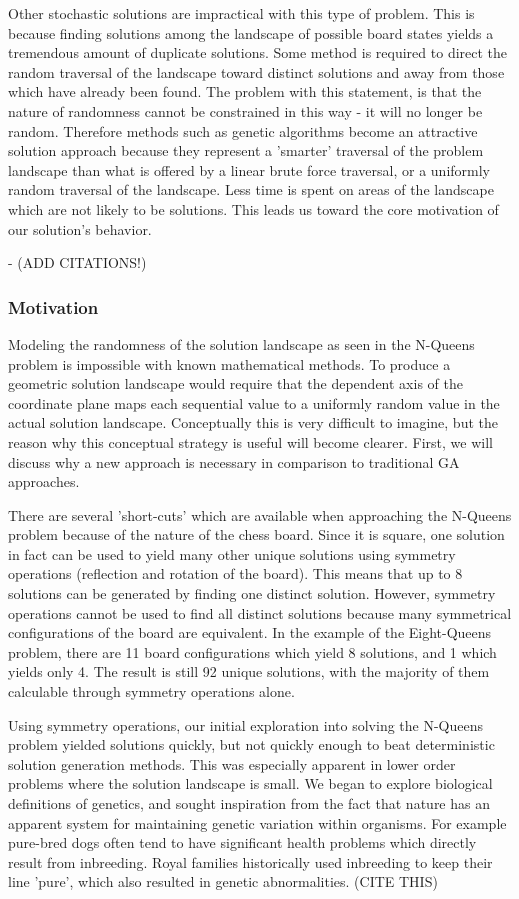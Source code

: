 \documentclass{sig-alternate}
\begin{document}
Other stochastic solutions are impractical with this type of problem. This is because finding solutions among the landscape of possible board states yields a tremendous amount of duplicate solutions. Some method is required to direct the random traversal of the landscape toward distinct solutions and away from those which have already been found. The problem with this statement, is that the nature of randomness cannot be constrained in this way - it will no longer be random. Therefore methods such as genetic algorithms become an attractive solution approach  because they represent a 'smarter' traversal of the problem landscape than what is offered by a linear brute force traversal, or a uniformly random traversal of the landscape. Less time is spent on areas of the landscape which are not likely to be solutions. This leads us toward the core motivation of our solution's behavior.

- (ADD CITATIONS!)

\subsubsection{Motivation}\label{motivation_section}
Modeling the randomness of the solution landscape as seen in the N-Queens problem is impossible with known mathematical methods. To produce a geometric solution landscape would require that the dependent axis of the coordinate plane maps each sequential value to a uniformly random value in the actual solution landscape. Conceptually this is very difficult to imagine, but the reason why this conceptual strategy is useful will become clearer. First, we will discuss why a new approach is necessary in comparison to traditional GA approaches.

There are several 'short-cuts' which are available when approaching the N-Queens problem because of the nature of the chess board. Since it is square, one solution in fact can be used to yield many other unique solutions using symmetry operations (reflection and rotation of the board). This means that up to 8 solutions can be generated by finding one distinct solution. However, symmetry operations cannot be used to find all distinct solutions because many symmetrical configurations of the board are equivalent. In the example of the Eight-Queens problem, there are 11 board configurations which yield 8 solutions, and 1 which yields only 4. The result is still 92 unique solutions, with the majority of them calculable through symmetry operations alone.

Using symmetry operations, our initial exploration into solving the N-Queens problem yielded solutions quickly, but not quickly enough to beat deterministic solution generation methods. This was especially apparent in lower order problems where the solution landscape is small. We began to explore biological definitions of genetics, and sought inspiration from the fact that nature has an apparent system for maintaining genetic variation within organisms. For example pure-bred dogs often tend to have significant health problems which directly result from inbreeding. Royal families historically used inbreeding to keep their line 'pure', which also resulted in genetic abnormalities. (CITE THIS)
\end{document}
